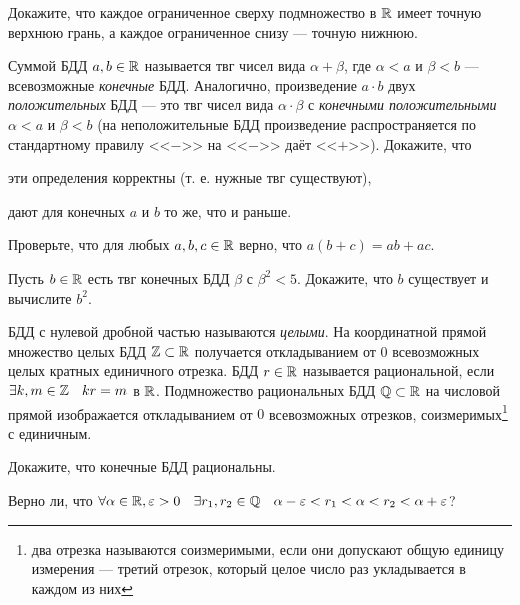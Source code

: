\documentclass[a4paper, 12pt, num=27]{listok}
\begin{document}
\begin{problem}\label{completness}
	Докажите, что каждое ограниченное сверху подмножество в $\mathbb{R}$ имеет точную верхнюю грань,
	а каждое ограниченное снизу --- точную нижнюю.
\end{problem}
\begin{problem}
	Суммой БДД $a, b \in \mathbb{R}$ называется твг чисел вида $\alpha + \beta$,
	где $\alpha < a$ и $\beta < b$ --- всевозможные \textit{конечные} БДД.
	Аналогично, произведение $a\cdot b$ двух \textit{положительных} БДД --- это твг чисел вида
	$\alpha \cdot \beta$ с \textit{конечными положительными} $\alpha < a$ и $\beta < b$
	(на неположительные БДД произведение распространяется по стандартному правилу <<$-$>> на <<$-$>> даёт <<$+$>>).
	Докажите, что
	\begin{probparts}
		\item эти определения корректны (т. е. нужные твг существуют),
		\item дают для конечных $a$ и $b$ то же, что и раньше.
		\item Проверьте, что для любых $a, b, c \in \mathbb{R}$ верно, что $a(b + c) = ab + ac$.
	\end{probparts}
\end{problem}
\begin{problem}[ (корни)]\label{roots}
	Пусть $b \in \mathbb{R}$ есть твг конечных БДД $\beta$ с $\beta^2 < 5$.
	Докажите, что $b$ существует и вычислите $b^2$.
\end{problem}
\begin{definition}
	БДД с нулевой дробной частью называются \textit{целыми}.
	На координатной прямой множество целых БДД $\mathbb{Z} \subset \mathbb{R}$ получается откладыванием от $0$ всевозможных целых кратных единичного отрезка.
	БДД $r \in \mathbb{R}$ называется рациональной, если $\exists{k,m \in \Z} kr = m$ в $\mathbb{R}$.
	Подмножество рациональных БДД $\mathbb{Q} \subset \mathbb{R}$ на числовой прямой изображается откладыванием от $0$ всевозможных отрезков,
	соизмеримых\footnote{два отрезка называются соизмеримыми, если они допускают общую единицу измерения --- третий отрезок,
	который целое число раз укладывается в каждом из них} с единичным.
\end{definition}
\begin{problem}
	Докажите, что конечные БДД рациональны.
\end{problem}
\begin{problem}
	Верно ли, что $\forall{\alpha \in \R, \epsilon > 0} \exists{r_1, r_2 \in \Q} \alpha - \epsilon < r_1 < \alpha < r_2 < \alpha + \epsilon$?
\end{problem}
\end{document}
